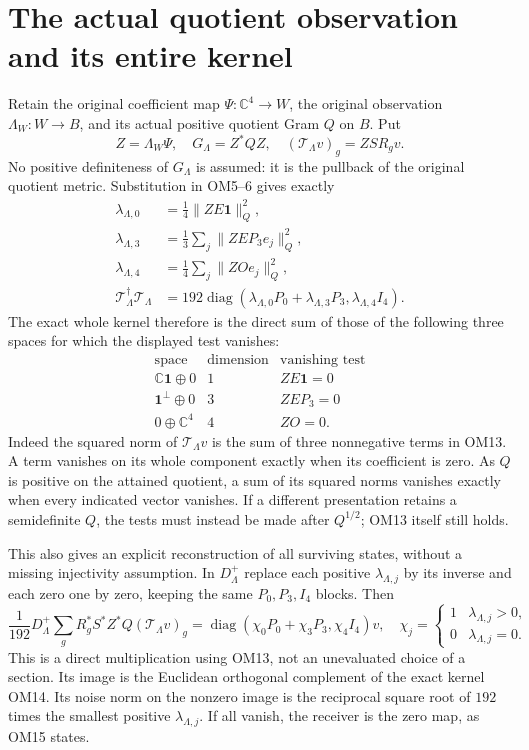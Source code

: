 \documentclass[11pt]{article}
\newcommand{\C}{\mathbb C}
\newcommand{\diag}{\operatorname{diag}}
\newcommand{\one}{\mathbf 1}
\begin{document}
\section{The actual quotient observation and its entire kernel}
Retain the original coefficient map $\Psi:\C^4\to W$, the original
observation $\Lambda_W:W\to B$, and its actual positive quotient
Gram $Q$ on $B$.  Put
\[
Z=\Lambda_W\Psi,\quad G_\Lambda=Z^*QZ,\quad
(\mathcal T_\Lambda v)_g=ZS R_gv.
\tag{OM12}
\]
No positive definiteness of $G_\Lambda$ is assumed: it is the
pullback of the original quotient metric.  Substitution in OM5--6
gives exactly
\[
\begin{split}
\lambda_{\Lambda,0}&=\tfrac14\|ZE\one\|_Q^2,\\
\lambda_{\Lambda,3}&=\tfrac13\sum_j\|ZE P_3e_j\|_Q^2,\\
\lambda_{\Lambda,4}&=\tfrac14\sum_j\|ZO e_j\|_Q^2,\\
\mathcal T_\Lambda^\dagger\mathcal T_\Lambda
&=192\diag(\lambda_{\Lambda,0}P_0+
\lambda_{\Lambda,3}P_3,\lambda_{\Lambda,4}I_4).
\end{split}\tag{OM13}
\]
The exact whole kernel therefore is the direct sum of those of the
following three spaces for which the displayed test vanishes:
\[
\begin{array}{c|c|c}
\text{space}&\text{dimension}&\text{vanishing test}\\ \hline
\C\one\oplus0&1&ZE\one=0\\
\one^\perp\oplus0&3&ZE P_3=0\\
0\oplus\C^4&4&ZO=0 .
\end{array}\tag{OM14}
\]
Indeed the squared norm of $\mathcal T_\Lambda v$ is the sum of
three nonnegative terms in OM13.  A term vanishes on its whole
component exactly when its coefficient is zero.  As $Q$ is
positive on the attained quotient, a sum of its squared norms
vanishes exactly when every indicated vector vanishes.
If a different presentation retains a semidefinite $Q$, the tests
must instead be made after $Q^{1/2}$; OM13 itself still holds.

This also gives an explicit reconstruction of all surviving states,
without a missing injectivity assumption.  In $D_{\Lambda}^{+}$
replace each positive $\lambda_{\Lambda,j}$ by its inverse and each
zero one by zero, keeping the same $P_0,P_3,I_4$ blocks.  Then
\[
\frac1{192}D_\Lambda^+
\sum_gR_g^*S^*Z^*Q(\mathcal T_\Lambda v)_g
=\diag(\chi_0P_0+\chi_3P_3,\chi_4I_4)v,
\quad
\chi_j=\begin{cases}1&\lambda_{\Lambda,j}>0,\\0&\lambda_{\Lambda,j}=0.
\end{cases}
\tag{OM15}
\]
This is a direct multiplication using OM13, not an unevaluated
choice of a section.  Its image is the Euclidean orthogonal
complement of the exact kernel OM14.  Its noise norm on the
nonzero image is the reciprocal square root of $192$ times the
smallest positive $\lambda_{\Lambda,j}$.  If all vanish, the
receiver is the zero map, as OM15 states.
\end{document}
